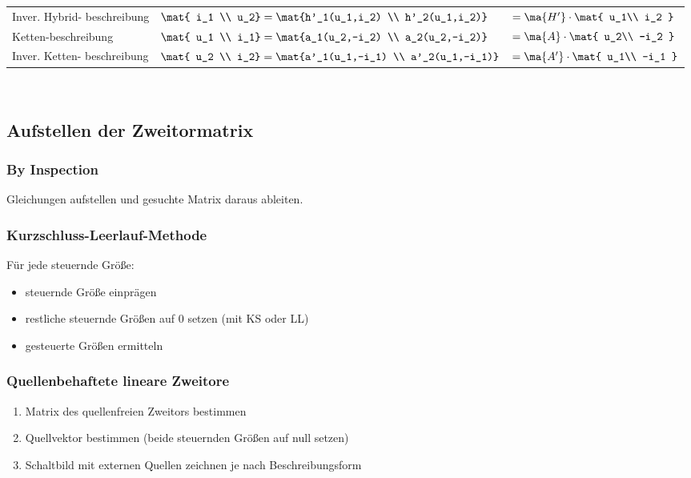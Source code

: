 \documentclass[fs, footer]{latex4ei}
\begin{document}
\begin{multicols*}{4}
\begin{tabular}{@{}p{1.3cm}|ll@{}}
        Inver. Hybrid- beschreibung & $\mat{ i_1                                                                              \\ u_2} = \mat{h'_1(u_1,i_2) \\ h'_2(u_1,i_2)}$ & $= \ma{H'} \cdot \mat{ u_1\\ i_2 }$ \\ \mrule
        Ketten-beschreibung         & $\mat{ u_1                                                                              \\ i_1} = \mat{a_1(u_2,-i_2) \\ a_2(u_2,-i_2)}$ & $= \ma{A} \cdot \mat{ u_2\\ -i_2 }$\\ \mrule
        Inver. Ketten- beschreibung & $\mat{ u_2                                                                              \\ i_2} = \mat{a'_1(u_1,-i_1) \\ a'_2(u_1,-i_1)}$ &  $= \ma{A'} \cdot \mat{ u_1\\ -i_1 }$
    \end{tabular}\\

    \subsection{Aufstellen der Zweitormatrix}
    \subsubsection{By Inspection}
    Gleichungen aufstellen und gesuchte Matrix daraus ableiten.
    \subsubsection{Kurzschluss-Leerlauf-Methode}
    Für jede steuernde Größe:
    \begin{itemize}
        \item steuernde Größe einprägen
        \item restliche steuernde Größen auf 0 setzen (mit KS oder LL)
        \item gesteuerte Größen ermitteln
    \end{itemize}
    \subsubsection{Quellenbehaftete lineare Zweitore}
    \begin{enumerate}\itemsep0pt
        \item Matrix des quellenfreien Zweitors bestimmen
        \item Quellvektor bestimmen (beide steuernden Größen auf null setzen)
        \item Schaltbild mit externen Quellen zeichnen je nach Beschreibungsform
    \end{enumerate}




\end{multicols*}
\end{document}
